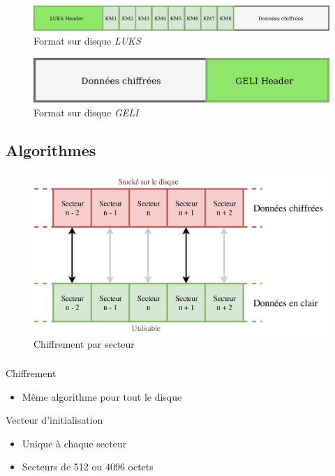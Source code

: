 \begin{frame}
  \frametitle{\insertsubsectionhead{}}
  \begin{figure}
    \includegraphics[width=\textwidth]{etat_art/format_disque_luks}
    \caption{Format sur disque \textit{LUKS}}
  \end{figure}
  \vfill
  \begin{figure}
    \includegraphics[width=.6\textwidth]{etat_art/format_disque_geli}
    \caption{Format sur disque \textit{GELI}}
  \end{figure}
\end{frame}

\subsection{Algorithmes}

\begin{frame}
  \frametitle{\insertsubsectionhead{}}
  \begin{figure}
    \includegraphics[width=.9\textwidth]{etat_art/disk_sectors}
    \caption{Chiffrement par secteur}
  \end{figure}
\end{frame}

\begin{frame}
  \frametitle{\insertsubsectionhead{}}
  \begin{block}{Chiffrement}
    \begin{itemize}
    \item Même algorithme pour tout le disque
    \end{itemize}
  \end{block}
  \begin{block}{Vecteur d'initialisation}
    \begin{itemize}
    \item Unique à chaque secteur
    \item Secteurs de 512 ou 4096 octets
    \end{itemize}
  \end{block}
\end{frame}

